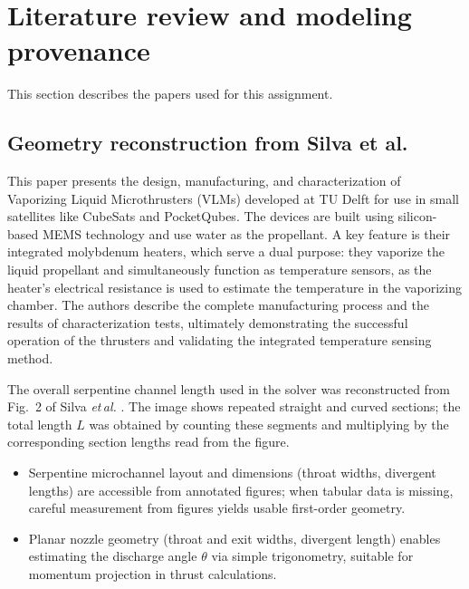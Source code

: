 \documentclass[11pt,a4paper]{article}
\begin{document}
\section{Literature review and modeling provenance}
This section describes the papers used for this assignment.

\subsection*{Geometry reconstruction from Silva et al.}

This paper presents the design, manufacturing, and characterization of Vaporizing Liquid Microthrusters (VLMs) developed at TU Delft for use in small satellites like CubeSats and PocketQubes. The devices are built using silicon-based MEMS technology and use water as the propellant. A key feature is their integrated molybdenum heaters, which serve a dual purpose: they vaporize the liquid propellant and simultaneously function as temperature sensors, as the heater's electrical resistance is used to estimate the temperature in the vaporizing chamber. The authors describe the complete manufacturing process and the results of characterization tests, ultimately demonstrating the successful operation of the thrusters and validating the integrated temperature sensing method.

The overall serpentine channel length used in the solver was reconstructed from Fig.~2 of Silva \emph{et\,al.} \cite{Silva2023}. The image shows repeated straight and curved sections; the total length \(L\) was obtained by counting these segments and multiplying by the corresponding section lengths read from the figure.

\begin{tcolorbox}[colback=blue!3!white,colframe=blue!40!black,title=Key takeaways from Silva et al. \cite{Silva2023},left=1mm,right=1mm,top=0.5mm,bottom=0.5mm]
\begin{itemize}[nosep]
  \item Serpentine microchannel layout and dimensions (throat widths, divergent lengths) are accessible from annotated figures; when tabular data is missing, careful measurement from figures yields usable first-order geometry.
  \item Planar nozzle geometry (throat and exit widths, divergent length) enables estimating the discharge angle \(\theta\) via simple trigonometry, suitable for momentum projection in thrust calculations.
\end{itemize}
\end{tcolorbox}
\end{document}
